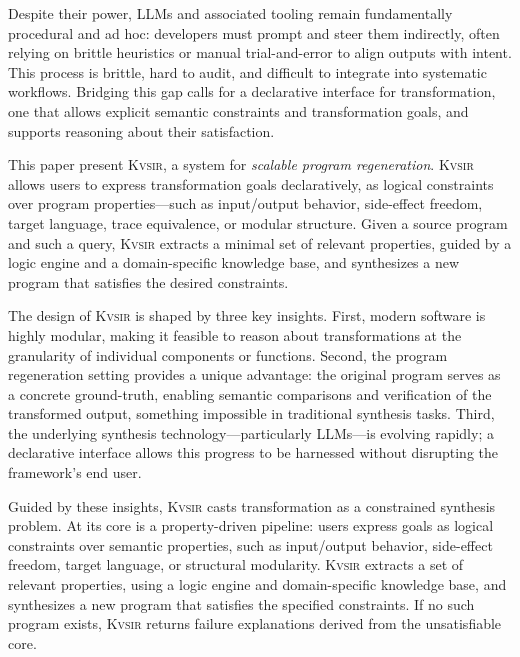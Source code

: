 \documentclass[sigplan]{acmart}
\newcommand{\sys}{{\scshape Kv{\textalpha}sir}\xspace}
\begin{document}

Despite their power, LLMs and associated tooling remain fundamentally
procedural and ad hoc: developers must prompt and steer them indirectly, often
relying on brittle heuristics or manual trial-and-error to align outputs with
intent.
This process is brittle, hard to audit, and difficult to integrate into systematic workflows.
Bridging this gap calls for a declarative interface for transformation, one that allows explicit semantic constraints and transformation goals, and supports reasoning about their satisfaction.

This paper present \sys, a system for \emph{scalable program regeneration}.
\sys allows users
to express transformation goals declaratively, as logical constraints over
program properties---such as input/output behavior, side-effect freedom, target
language, trace equivalence, or modular structure.
Given a source program and
such a query, \sys extracts a minimal set of relevant properties, guided by a
logic engine and a domain-specific knowledge base, and synthesizes a new
program that satisfies the desired constraints.

The design of \sys is shaped by three key insights.
First, modern software is highly modular, making it feasible to reason about transformations at the granularity of individual components or functions.
Second, the program regeneration setting provides a unique advantage: the original program serves as a concrete ground-truth, enabling semantic comparisons and verification of the transformed output, something impossible in traditional synthesis tasks.
Third, the underlying synthesis technology---particularly LLMs---is evolving rapidly; a declarative interface allows this progress to be harnessed without disrupting the framework's end user.

Guided by these insights, \sys casts transformation as a constrained synthesis problem.
At its core is a property-driven pipeline: users express goals as logical constraints over semantic properties, such as input/output behavior, side-effect freedom, target language, or structural modularity.
\sys extracts a set of relevant properties, using a logic engine and domain-specific knowledge base, and synthesizes a new program that satisfies the specified constraints.
If no such program exists, \sys returns failure explanations derived from the unsatisfiable core.
\end{document}
